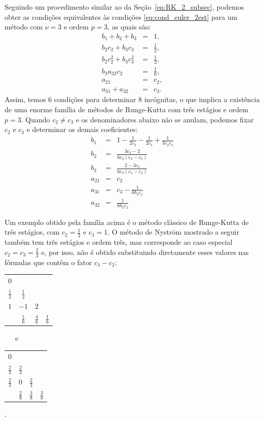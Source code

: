 Seguindo um procedimento similar ao da Seção~\ref{eq:RK_2_subsec}, podemos obter as condições equivalentes às condições \eqref{eq:cond_euler_2est} para um método com $\nu =3$ e ordem $p=3$, as quais são:
\begin{eqnarray}\label{eq:cond_euler_3est}
  b_1+b_2+b_3		&=& 1,            		\label{eq:cond_euler_3est:1} \\
  b_2c_2+b_3c_3 	&=& \frac{1}{2},	 	\label{eq:cond_euler_3est:2} \\
  b_2c_2^2+b_3c_3^2	&=& \frac{1}{3}, 		\label{eq:cond_euler_3est:3} \\
  b_3a_{32}c_2		&=& \frac{1}{6},		\label{eq:cond_euler_3est:4} \\
  a_{21}		&=& c_2,			\label{eq:cond_euler_3est:5} \\
  a_{31}+a_{32}		&=& c_3.			\label{eq:cond_euler_3est:6}
\end{eqnarray}
Assim, temos 6 condições para determinar 8 incógnitas, o que implica a existência de uma enorme família de métodos de Runge-Kutta com três estágios e ordem $p=3$. Quando $c_2\neq c_3$ e os denominadores abaixo não se anulam, podemos fixar $c_2$ e $c_3$ e determinar os demais coeficientes:
\begin{eqnarray}
 b_1&=&1-\frac{1}{2c_2}-\frac{1}{2c_3}+\frac{1}{3c_2c_3}\\
 b_2&=&\frac{3c_3-2}{6c_2(c_3-c_2)}\\
 b_3&=&\frac{2-3c_2}{6c_3(c_3-c_2)}\\
 a_{21}&=&c_2\\
 a_{31}&=&c_3-\frac{1}{6b_3c_2}\\
 a_{32}&=&\frac{1}{6b_3c_2}
\end{eqnarray}


Um exemplo obtido pela família acima é o método clássico de Runge-Kutta de três estágios, com $c_2=\frac{1}{2}$ e $c_3=1$. O método de Nyström mostrado a seguir também tem três estágios e ordem três, mas corresponde ao caso especial $c_2=c_3=\frac{2}{3}$ e, por isso, não é obtido substituindo diretamente esses valores nas fórmulas que contêm o fator $c_3-c_2$:
\begin{center}
\begin{tabular}{c|ccc}
  $0$           &               &               & \\
  $\frac{1}{2}$ & $\frac{1}{2}$ &               & \\
  $1$           & $-1$          & $2$           & \\  \hline
                & $\frac{1}{6}$ & $\frac{4}{6}$ & $\frac{1}{6}$
\end{tabular}
~~~e~~~~~~\begin{tabular}{c|ccc}
  $0$ &     &   & \\
  $\frac{2}{3}$ & $\frac{2}{3}$ &   & \\
  $\frac{2}{3}$ & $0$ &$\frac{2}{3}$& \\  \hline
      & $\frac{2}{8}$ &$\frac{3}{8}$& $\frac{3}{8}$
\end{tabular}.
\end{center}

